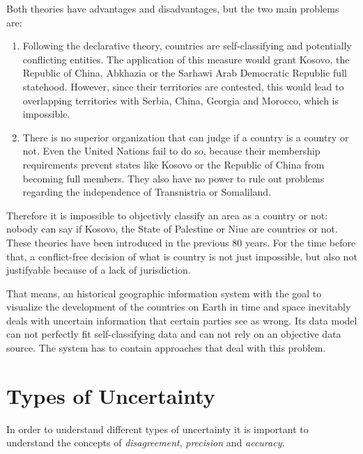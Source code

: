 Both theories have advantages and disadvantages, but the two main problems are:
\begin{enumerate}
  \item Following the declarative theory, countries are self-classifying and potentially conflicting entities. The application of this measure would grant Kosovo, the Republic of China, Abkhazia or the Sarhawi Arab Democratic Republic full statehood. However, since their territories are contested, this would lead to overlapping territories with Serbia, China, Georgia and Morocco, which is impossible.
  \item There is no superior organization that can judge if a country is a country or not. Even the United Nations fail to do so, because their membership requirements prevent states like Kosovo or the Republic of China from becoming full members. They also have no power to rule out problems regarding the independence of Transnistria or Somaliland.
\end{enumerate}

Therefore it is impossible to objectivly classify an area as a country or not: nobody can say if Kosovo, the State of Palestine or Niue are countries or not. These theories have been introduced in the previous 80 years. For the time before that, a conflict-free decision of what is country is not just impossible, but also not justifyable because of a lack of jurisdiction.

That means, an historical geographic information system with the goal to visualize the development of the countries on Earth in time and space inevitably deals with uncertain information that certain parties see as wrong. Its data model can not perfectly fit self-classifying data and can not rely on an objective data source. The system has to contain approaches that deal with this problem.




\section{Types of Uncertainty} %
\label{sec:types_of_uncertainty}

In order to understand different types of uncertainty it is important to understand the concepts of \emph{disagreement}, \emph{precision} and \emph{accuracy}.

